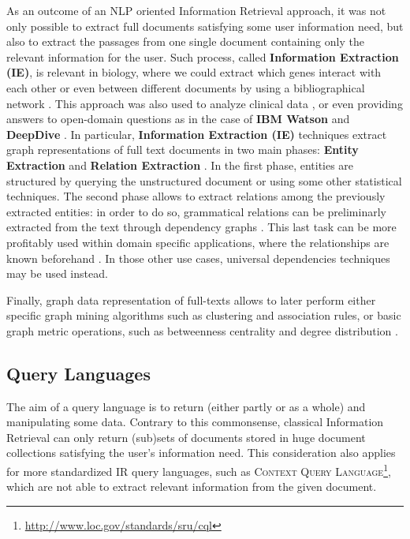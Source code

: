 As an outcome of an NLP oriented Information Retrieval approach, it was  not only possible to extract full documents satisfying some user information need, but also to extract the passages from one single document containing only the relevant information for the user. Such process, called \textbf{Information Extraction (IE)}, is relevant in  biology, where we could extract which genes interact with each other \cite{MalloryZRA16} or even between different documents by using a bibliographical network \cite{Song14Discovering}. This approach was also used to analyze  clinical data \cite{medical}, or even providing answers to open-domain questions as in the case of \textbf{IBM Watson} \cite{IBMWatson} and \textbf{DeepDive} \cite{PalomaresAKR16}. 
In particular, \textbf{Information Extraction (IE)} techniques extract graph representations of full text documents in two main phases: \textbf{Entity Extraction} and \textbf{Relation Extraction} \cite{Sarawagi}. In the first phase, entities are structured by querying the unstructured document  or using some other statistical techniques. The second phase allows to extract relations among the previously extracted entities: in order to do so, grammatical relations can be preliminarly extracted from the text through dependency graphs \cite{MarneffeDSHGNM14}.
This last task can be more profitably used within domain specific applications, where the relationships are known beforehand \cite{ZhangRCSWW17}. In those other use cases, universal dependencies techniques may be used instead.%

Finally, graph data representation of full-texts allows to later perform either specific graph mining algorithms \cite{Samatova} such as clustering \cite{Chen10} and association rules, or basic graph metric operations, such as betweenness centrality and degree distribution \cite{Newman}. 
	
\subsection{Query Languages}\label{subsec:unstructlang}
The aim of a query language is to return (either partly or as a whole) and manipulating some data. Contrary to this commonsense, classical Information Retrieval \cite{Manning} can only return (sub)sets of documents stored in huge document collections satisfying the user's information need. This consideration also applies for more standardized IR query languages, such as  \textsc{Context Query Language}\footnote{\url{http://www.loc.gov/standards/sru/cql}}, which are not able to extract relevant information from the given document.

